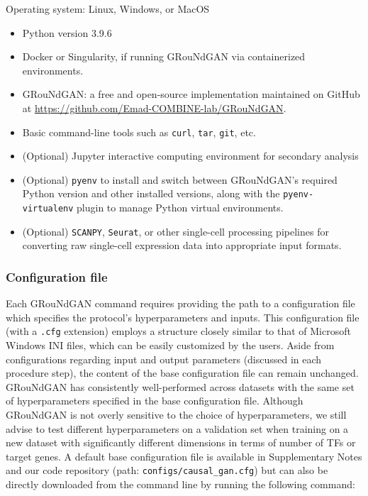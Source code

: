 Operating system: Linux, Windows, or MacOS
\begin{itemize}
	\item Python version 3.9.6
	\item Docker or Singularity, if running GRouNdGAN via containerized environments.
	\item GRouNdGAN: a free and open-source implementation maintained on GitHub at  
	\url{https://github.com/Emad-COMBINE-lab/GRouNdGAN}.
	\item Basic command-line tools such as \texttt{curl}, \texttt{tar}, \texttt{git}, etc.
	\item (Optional) Jupyter interactive computing environment for secondary analysis
	\item (Optional) \texttt{pyenv} to install and switch between GRouNdGAN’s required Python version and other installed versions, along with the \texttt{pyenv-virtualenv} plugin to manage Python virtual environments.
	\item (Optional) \texttt{SCANPY}, \texttt{Seurat}, or other single-cell processing pipelines for converting raw single-cell expression data into appropriate input formats.
\end{itemize}

\subsubsection*{Configuration file}

Each GRouNdGAN command requires providing the path to a configuration file which specifies
the protocol’s hyperparameters and inputs. This configuration file (with a \texttt{.cfg} extension)
employs a structure closely similar to that of Microsoft Windows INI files, which can be easily
customized by the users. Aside from configurations regarding input and output parameters
(discussed in each procedure step), the content of the base configuration file can remain
unchanged. GRouNdGAN has consistently well-performed across datasets with the same set of
hyperparameters specified in the base configuration file. Although GRouNdGAN is not overly
sensitive to the choice of hyperparameters, we still advise to test different hyperparameters on
a validation set when training on a new dataset with significantly different dimensions in terms
of number of TFs or target genes. A default base configuration file is available in Supplementary Notes and our code repository (path: \texttt{configs/\allowbreak causal\_gan.cfg}) but can also be directly
downloaded from the command line by running the following command: 

